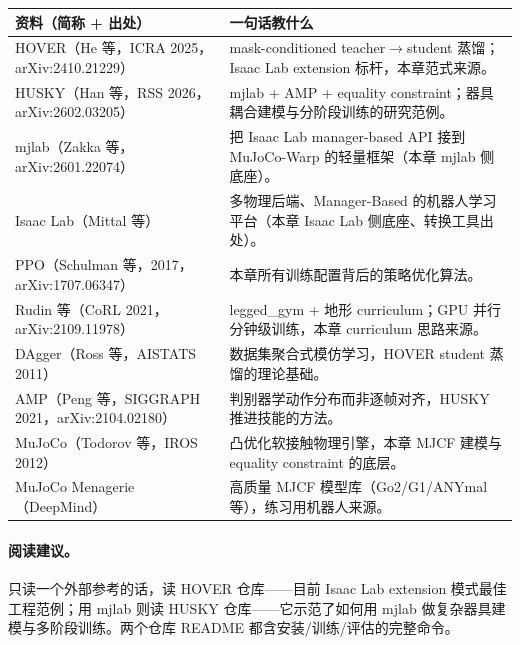 \begin{center}
\small
\begin{tabular}{@{}p{6.2cm}p{7.2cm}@{}}
\toprule
资料（简称 + 出处） & 一句话教什么 \\
\midrule
HOVER（He 等，ICRA 2025，arXiv:2410.21229）\,\cite{he2025hover} & mask-conditioned teacher$\to$student 蒸馏；Isaac Lab extension 标杆，本章范式来源。 \\
HUSKY（Han 等，RSS 2026，arXiv:2602.03205）\,\cite{husky2026} & mjlab + AMP + equality constraint；器具耦合建模与分阶段训练的研究范例。 \\
mjlab（Zakka 等，arXiv:2601.22074）\,\cite{mjlab2026} & 把 Isaac Lab manager-based API 接到 MuJoCo-Warp 的轻量框架（本章 mjlab 侧底座）。 \\
Isaac Lab（Mittal 等）\,\cite{mittal2025isaaclab} & 多物理后端、Manager-Based 的机器人学习平台（本章 Isaac Lab 侧底座、转换工具出处）。 \\
PPO（Schulman 等，2017，arXiv:1707.06347）\,\cite{schulman2017ppo} & 本章所有训练配置背后的策略优化算法。 \\
Rudin 等（CoRL 2021，arXiv:2109.11978）\,\cite{rudin2021minutes} & legged\_gym + 地形 curriculum；GPU 并行分钟级训练，本章 curriculum 思路来源。 \\
DAgger（Ross 等，AISTATS 2011）\,\cite{ross2011dagger} & 数据集聚合式模仿学习，HOVER student 蒸馏的理论基础。 \\
AMP（Peng 等，SIGGRAPH 2021，arXiv:2104.02180）\,\cite{peng2021amp} & 判别器学动作分布而非逐帧对齐，HUSKY 推进技能的方法。 \\
MuJoCo（Todorov 等，IROS 2012）\,\cite{todorov2012mujoco} & 凸优化软接触物理引擎，本章 MJCF 建模与 equality constraint 的底层。 \\
MuJoCo Menagerie（DeepMind）\,\cite{menagerie2022} & 高质量 MJCF 模型库（Go2/G1/ANYmal 等），练习用机器人来源。 \\
\bottomrule
\end{tabular}
\end{center}

\paragraph{阅读建议。}只读一个外部参考的话，读 HOVER 仓库——目前 Isaac Lab extension 模式最佳工程范例；用 mjlab 则读 HUSKY 仓库——它示范了如何用 mjlab 做复杂器具建模与多阶段训练。两个仓库 README 都含安装/训练/评估的完整命令。

